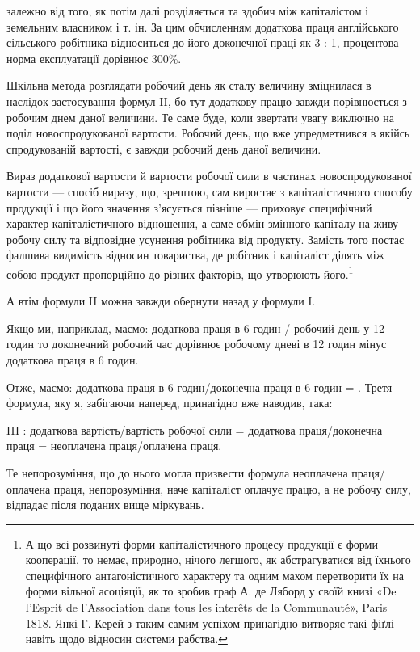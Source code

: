 \parcont{}  %
залежно від того, як потім далі розділяється та здобич між капіталістом
і земельним власником і т. ін. За цим обчисленням
додаткова праця англійського сільського робітника відноситься
до його доконечної праці як 3 : 1, процентова норма експлуатації
дорівнює 300\%.

Шкільна метода розглядати робочий день як сталу величину
зміцнилася в наслідок застосування формул II, бо тут додаткову
працю завжди порівнюється з робочим днем даної величини.
Те саме буде, коли звертати увагу виключно на поділ новоспродукованої
вартости. Робочий день, що вже упредметнився в якійсь
спродукованій вартості, є завжди робочий день даної величини.

Вираз додаткової вартости й вартости робочої сили в частинах
новоспродукованої вартости — спосіб виразу, що, зрештою,
сам виростає з капіталістичного способу продукції і що його
значення з’ясується пізніше — приховує специфічний характер
капіталістичного відношення, а саме обмін змінного капіталу
на живу робочу силу та відповідне усунення робітника від продукту.
Замість того постає фалшива видимість відносин товариства,
де робітник і капіталіст ділять між собою продукт пропорційно
до різних факторів, що утворюють його.\footnote{
А що всі розвинуті форми капіталістичного процесу продукції
є форми кооперації, то немає, природно, нічого легшого, як абстрагуватися
від їхнього специфічного антагоністичного характеру та одним
махом перетворити їх на форми вільної асоціяції, як то зробив граф
А. де Ляборд у своїй книзі «De l’Esprit de l’Association dans tous les
interêts de la Communauté», Paris 1818. Янкі Г. Керей з таким самим
успіхом принагідно витворяє такі фіґлі навіть щодо відносин системи
рабства.
}

А втім формули II можна завжди обернути назад у формули І.

Якщо ми, наприклад, маємо: додаткова праця в 6 годин /
робочий день у 12 годин то доконечний
робочий час дорівнює робочому дневі в 12 годин мінус
додаткова праця в 6 годин.

Отже, маємо:
додаткова праця в 6 годин/доконечна праця в 6 годин = .
Третя формула, яку я, забігаючи наперед, принагідно вже
наводив, така:

III : додаткова вартість/вартість робочої сили =
додаткова праця/доконечна праця =
неоплачена праця/оплачена праця.

Те непорозуміння, що до нього могла призвести формула
неоплачена праця/оплачена праця, непорозуміння, наче капіталіст оплачує працю,
а не робочу силу, відпадає після поданих вище міркувань.
\parbreak{}  %
